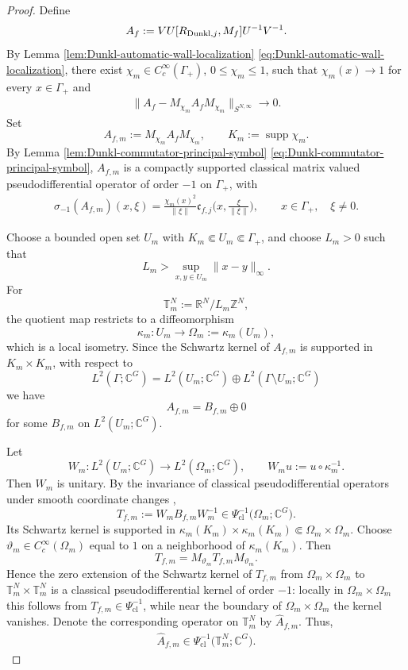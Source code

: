\documentclass{amsart}
\begin{document}
\begin{proof}
Define
\begin{align*}
A_f
:=
VU[R_{{\rm Dunkl},j},M_f]U^{-1}V^{-1}.
\end{align*}
By Lemma \ref{lem:Dunkl-automatic-wall-localization}
\eqref{eq:Dunkl-automatic-wall-localization}, there exist
\(\chi_m\in C_c^\infty(\Gamma_+)\), \(0\leq\chi_m\leq1\), such that
\(\chi_m(x)\to1\) for every \(x\in\Gamma_+\) and
\begin{align}
\big\|
A_f-M_{\chi_m}A_fM_{\chi_m}
\big\|_{S^{N,\infty}}
\longrightarrow0.
\label{eq:Dunkl-smooth-localization-convergence}
\end{align}
Set
\[
A_{f,m}:=M_{\chi_m}A_fM_{\chi_m},
\qquad
K_m:=\operatorname{supp}\chi_m.
\]
By Lemma \ref{lem:Dunkl-commutator-principal-symbol}
\eqref{eq:Dunkl-commutator-principal-symbol},
\(A_{f,m}\) is a compactly supported classical matrix valued pseudodifferential operator of order \(-1\) on \(\Gamma_+\), with
\begin{align}
\sigma_{-1}(A_{f,m})(x,\xi)
=
\frac{\chi_m(x)^2}{\|\xi\|}
\mathfrak c_{f,j}
\bigg(
x,\frac{\xi}{\|\xi\|}
\bigg),
\qquad
x\in\Gamma_+,\quad \xi\neq0.
\label{eq:Dunkl-smooth-localized-symbol}
\end{align}

Choose a bounded open set \(U_m\) with
\(K_m\Subset U_m\Subset\Gamma_+\), and choose \(L_m>0\) such that
\[
L_m>\sup_{x,y\in U_m}\|x-y\|_\infty.
\]
For
\[
\mathbb T_m^N:=\mathbb R^N/L_m\mathbb Z^N,
\]
the quotient map restricts to a diffeomorphism
\[
\kappa_m:U_m\longrightarrow\Omega_m:=\kappa_m(U_m),
\]
which is a local isometry. Since the Schwartz kernel of \(A_{f,m}\) is supported in \(K_m\times K_m\), with respect to
\[
L^2(\Gamma;\mathbb C^G)
=
L^2(U_m;\mathbb C^G)
\oplus
L^2(\Gamma\setminus U_m;\mathbb C^G)
\]
we have
\[
A_{f,m}=B_{f,m}\oplus0
\]
for some \(B_{f,m}\) on \(L^2(U_m;\mathbb C^G)\).

Let
\[
W_m:L^2(U_m;\mathbb C^G)\longrightarrow
L^2(\Omega_m;\mathbb C^G),
\qquad
W_mu:=u\circ\kappa_m^{-1}.
\]
Then \(W_m\) is unitary. By the invariance of classical pseudodifferential operators under smooth coordinate changes
\cite[Theorem~18.1.17]{MR0781536},
\[
T_{f,m}:=W_mB_{f,m}W_m^{-1}
\in
\Psi_{\mathrm{cl}}^{-1}
\big(
\Omega_m;\mathbb C^G
\big).
\]
Its Schwartz kernel is supported in
\(\kappa_m(K_m)\times\kappa_m(K_m)\Subset\Omega_m\times\Omega_m\).
Choose \(\vartheta_m\in C_c^\infty(\Omega_m)\) equal to \(1\) on a neighborhood of \(\kappa_m(K_m)\). Then
\[
T_{f,m}=M_{\vartheta_m}T_{f,m}M_{\vartheta_m}.
\]
Hence the zero extension of the Schwartz kernel of \(T_{f,m}\) from
\(\Omega_m\times\Omega_m\) to
\(\mathbb T_m^N\times\mathbb T_m^N\) is a classical pseudodifferential kernel of order \(-1\): locally in \(\Omega_m\times\Omega_m\) this follows from \(T_{f,m}\in\Psi_{\mathrm{cl}}^{-1}\), while near the boundary of \(\Omega_m\times\Omega_m\) the kernel vanishes. Denote the corresponding operator on \(\mathbb T_m^N\) by \(\widehat A_{f,m}\). Thus,
\begin{align}
\widehat A_{f,m}
\in
\Psi_{\mathrm{cl}}^{-1}
\big(
\mathbb T_m^N;\mathbb C^G
\big).
\label{eq:Dunkl-smooth-torus-Psi}
\end{align}


\end{proof}
\end{document}
